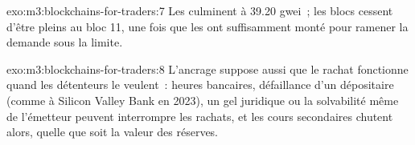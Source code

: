 \begin{solution}{exo:m3:blockchains-for-traders:7}
Les  culminent à 39.20 gwei~; les blocs cessent d'être pleins au bloc 11, une fois que les  ont suffisamment
monté pour ramener la demande sous la limite.
\end{solution}

\begin{solution}{exo:m3:blockchains-for-traders:8}
L'ancrage suppose aussi que le rachat fonctionne quand les détenteurs le veulent~: heures bancaires, défaillance d'un dépositaire (comme à Silicon
Valley Bank en 2023), un gel juridique ou la solvabilité même de l'émetteur peuvent interrompre les rachats, et les cours secondaires
chutent alors, quelle que soit la valeur des réserves.
\end{solution}

